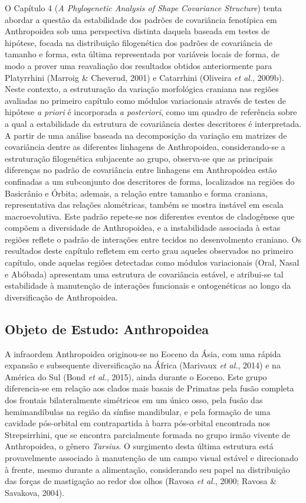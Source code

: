 \documentclass[12pt,twoside]{report}
\begin{document}
O Capítulo 4 (\emph{A Phylogenetic Analysis of Shape Covariance
Structure}) tenta abordar a questão da estabilidade dos padrões de
covariância fenotípica em Anthropoidea sob uma perspectiva distinta
daquela baseada em testes de hipótese, focada na distribuição
filogenética dos padrões de covariância de tamanho e forma, esta última
representada por variáveis locais de forma, de modo a prover uma
reavaliação dos resultados obtidos anteriormente para Platyrrhini
(Marroig \& Cheverud, 2001) e Catarrhini (Oliveira \emph{et al.},
2009b). Neste contexto, a estruturação da variação morfológica craniana
nas regiões avaliadas no primeiro capítulo como módulos variacionais
através de testes de hipótese \emph{a priori} é incorporada \emph{a
posteriori}, como um quadro de referência sobre a qual a estabilidade da
estrutura de covariância destes descritores é interpretada. A partir de
uma análise baseada na decomposição da variação em matrizes de
covariância dentre as diferentes linhagens de Anthropoidea,
considerando-se a estruturação filogenética subjacente ao grupo,
observa-se que as principais diferenças no padrão de covariância entre
linhagens em Anthropoidea estão confinadas a um subconjunto dos
descritores de forma, localizados na regiões do Basicrânio e Órbita;
ademais, a relação entre tamanho e forma craniana, representativa das
relações alométricas, também se mostra instável em escala
macroevolutiva. Este padrão repete-se nos diferentes eventos de
cladogênese que compõem a diversidade de Anthropoidea, e a instabilidade
associada à estas regiões reflete o padrão de interações entre tecidos
no desenvolmento craniano. Os resultados deste capítulo refletem em
certo grau aqueles observados no primeiro capítulo, onde aquelas regiões
detectadas como módulos variacionais (Oral, Nasal e Abóbada) apresentam
uma estrutura de covariância estável, e atribui-se tal estabilidade à
manutenção de interações funcionais e ontogenéticas ao longo da
diversificação de Anthropoidea.

\subsection{Objeto de Estudo:
Anthropoidea}\label{objeto-de-estudo-anthropoidea}

A infraordem Anthropoidea originou-se no Eoceno da Ásia, com uma rápida
expansão e subsequente diversificação na África (Marivaux \emph{et al.},
2014) e na América do Sul (Bond \emph{et al.}, 2015), ainda durante o
Eoceno. Este grupo diferencia-se em relação aos clados mais basais de
Primatas pela fusão completa dos frontais bilateralmente simétricos em
um único osso, pela fusão das hemimandíbulas na região da sínfise
mandibular, e pela formação de uma cavidade pós-orbital em contrapartida
à barra pós-orbital encontrada nos Strepsirrhini, que se encontra
parcialmente formada no grupo irmão vivente de Anthropoidea, o gênero
\emph{Tarsius}. O surgimento desta última estrutura está provavelmente
associado à manutenção de um campo visual estável e direcionado à
frente, mesmo durante a alimentação, considerando seu papel na
distribuição das forças de mastigação ao redor dos olhos (Ravosa
\emph{et al.}, 2000; Ravosa \& Savakova, 2004).
\end{document}

